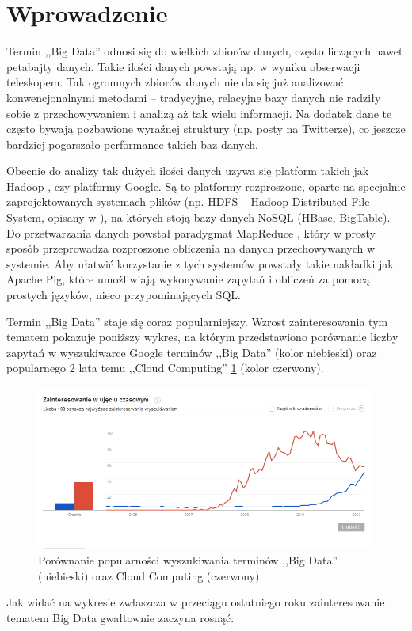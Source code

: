 \section{Wprowadzenie}
\label{sec:Wprowadzenie}

Termin ,,Big Data'' odnosi się do wielkich zbiorów danych, często liczących nawet petabajty danych. Takie ilości danych powstają np. w wyniku obserwacji teleskopem. Tak ogromnych zbiorów danych nie da się już analizować konwencjonalnymi metodami -- tradycyjne, relacyjne bazy danych nie radziły sobie z przechowywaniem i analizą aż tak wielu informacji. Na dodatek dane te często bywają pozbawione wyraźnej struktury (np. posty na Twitterze), co jeszcze bardziej pogarszało performance takich baz danych.

Obecnie do analizy tak dużych ilości danych uzywa się platform takich jak Hadoop \cite{apache:hadoop}, czy platformy Google. Są to platformy rozproszone, oparte na specjalnie zaprojektowanych systemach plików (np. HDFS -- Hadoop Distributed File System, opisany w \cite{shvachko10}), na których stoją bazy danych NoSQL (HBase, BigTable). Do przetwarzania danych powstał paradygmat MapReduce \cite{dean08}, który w prosty sposób przeprowadza rozproszone obliczenia na danych przechowywanych w systemie. Aby ułatwić korzystanie z tych systemów powstały takie nakładki jak Apache Pig, które umożliwiają wykonywanie zapytań i obliczeń za pomocą prostych języków, nieco przypominających SQL.

Termin ,,Big Data'' staje się coraz popularniejszy. Wzrost zainteresowania tym tematem pokazuje poniższy wykres, na którym przedstawiono porównanie liczby zapytań w wyszukiwarce Google terminów ,,Big Data'' (kolor niebieski) oraz popularnego 2 lata temu ,,Cloud Computing'' \ref{fig:big_data_popularnosc} (kolor czerwony).

\begin{figure}[h]
\centerline{\includegraphics[scale=2.5]{obrazki/trend-big-data_cloud-computing.png}}
\caption{Porównanie popularności wyszukiwania terminów ,,Big Data'' (niebieski) oraz Cloud Computing (czerwony)}
\label{fig:big_data_popularnosc}
\end{figure}

Jak widać na wykresie zwłaszcza w przeciągu ostatniego roku zainteresowanie tematem Big Data gwałtownie zaczyna rosnąć.


